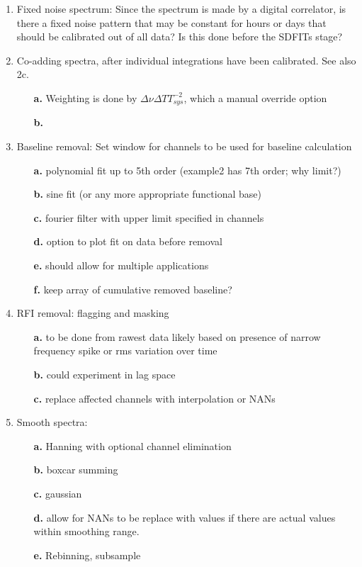 \documentclass[12pt,a4paper]{article}
\begin{document}
\begin{enumerate}
\item   Fixed noise spectrum:
   Since the spectrum is made by a digital correlator, is there
      a fixed noise pattern that may be constant for hours or days
      that should be calibrated out of all data?
      Is this done before the SDFITs stage?

\item  Co-adding spectra, after individual integrations have been calibrated. See also 2c.
  \begin{itemize}
  \item[{\bf a.}]   
    Weighting is done by
    $ \Delta\nu \Delta T T_{sys}^{-2} $, which a manual override option
  \item[{\bf b.}]   

  \end{itemize}
      

\item    Baseline removal:
   Set window for channels to be used for baseline calculation
   \begin{itemize}
  \item[{\bf a.}]   
    polynomial fit up to 5th order (example2 has 7th order; why limit?)
  \item[{\bf b.}]   
    sine fit (or any more appropriate functional base)
  \item[{\bf c.}]   
    fourier filter with upper limit specified in channels
  \item[{\bf d.}]   
    option to plot fit on data before removal
  \item[{\bf e.}]   
    should allow for multiple applications
  \item[{\bf f.}]   
   keep array of cumulative removed baseline?
  \end{itemize}

\item RFI removal: flagging and masking
  \begin{itemize}
  \item[{\bf a.}]  
   to be done from rawest data likely based on presence of narrow 
   frequency spike or rms variation over time
  \item[{\bf b.}]  
    could experiment in lag space
  \item[{\bf c.}]      
   replace affected channels with interpolation or NANs
  \end{itemize}

\item Smooth spectra:
  \begin{itemize}
  \item[{\bf a.}]  
    Hanning with optional channel elimination
  \item[{\bf b.}]  
    boxcar summing
  \item[{\bf c.}]
    gaussian
  \item[{\bf d.}]   
   allow for NANs to be replace with values if there
   are actual values within smoothing range.
 \item[{\bf e.}]
   Rebinning, subsample
  \end{itemize}


\end{enumerate}
\end{document}
